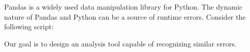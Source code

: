 \Large
Pandas is a widely used data manipulation library for Python.
The dynamic nature of Pandas and Python can be a source of runtime errors.
Consider the following script:



Our goal is to design an analysis tool capable of recognizing similar errors.